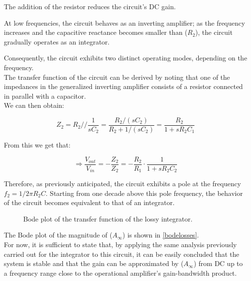 \documentclass[../main.tex]{subfiles}
\begin{document}
The addition of the resistor reduces the circuit's DC gain. 

At low frequencies, the circuit behaves as an inverting amplifier; as the frequency increases and the capacitive reactance becomes smaller than ($R_2$), the circuit gradually operates as an integrator. 

Consequently, the circuit exhibits two distinct operating modes, depending on the frequency.\\

The transfer function of the circuit can be derived by noting that one of the impedances in the generalized inverting amplifier consists of a resistor connected in parallel with a capacitor.\\

We can then obtain:

\begin{equation}
	Z_2 = R_2 // \frac{1}{sC_2} = \frac{R_2 / (sC_2)}{R_2 + 1 /(sC_2)} = \frac{R_2}{1 + sR_2C_1}
\end{equation}

From this we get that:

\begin{equation}
	\Rightarrow \frac{V_{out}}{V_{in}} = - \frac{Z_2}{Z_2} = - \frac{R_2}{R_1} \cdot \frac{1}{1 + sR_2C_2}
\end{equation}


Therefore, as previously anticipated, the circuit exhibits a pole at the frequency $f_2 = 1 / 2\pi R_2 C$. Starting from one decade above this pole frequency, the behavior of the circuit becomes equivalent to that of an integrator.


\begin{figure}[h!]
\begin{center}

\label{bodelosses}
\caption{Bode plot of the transfer function of the lossy integrator.}	
\end{center}	
\end{figure}

The Bode plot of the magnitude of ($A_\infty$) is shown in \autoref{bodelosses}.\\

For now, it is sufficient to state that, by applying the same analysis previously carried out for the integrator to this circuit, it can be easily concluded that the system is stable and that the gain can be approximated by ($A_\infty$) from DC up to a frequency range close to the operational amplifier’s gain-bandwidth product.\\
\end{document}
